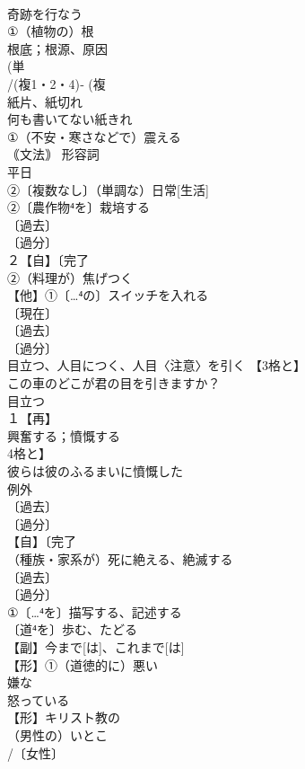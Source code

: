 \documentclass[8pt]{extreport}
\begin{document}
\begin{CJK}{UTF8}{min}
\\	奇跡を行なう
\\	①（植物の）根 
\\	根底；根源、原因
\\	(単
\\	/(複1・2・4)‐ (複
\\	紙片、紙切れ 
\\	何も書いてない紙きれ 
\\	①（不安・寒さなどで）震える 
\\	｟文法｠ 形容詞
\\	平日 
\\	②〔複数なし〕（単調な）日常[生活]
\\	②〔農作物⁴を〕栽培する 
\\	〔過去〕
\\	〔過分〕
\\	２【自】〔完了
\\	②（料理が）焦げつく　
\\	【他】①〔…⁴の〕スイッチを入れる 
\\	〔現在〕
\\	〔過去〕
\\	〔過分〕
\\	目立つ、人目につく、人目〈注意〉を引く 【3格と】
\\	この車のどこが君の目を引きますか？ 
\\	目立つ
\\	１【再】
\\	興奮する；憤慨する 
\\	4格と】
\\	彼らは彼のふるまいに憤慨した
\\	例外 
\\	〔過去〕
\\	〔過分〕
\\	【自】〔完了
\\	（種族・家系が）死に絶える、絶滅する　
\\	〔過去〕
\\	〔過分〕
\\	①〔…⁴を〕描写する、記述する 
\\	〔道⁴を〕歩む、たどる
\\	【副】今まで[は]、これまで[は]
\\	【形】①（道徳的に）悪い　
\\	嫌な　
\\	怒っている
\\	【形】キリスト教の 
\\	（男性の）いとこ 
\\	/〔女性〕

\end{CJK}
\end{document}
